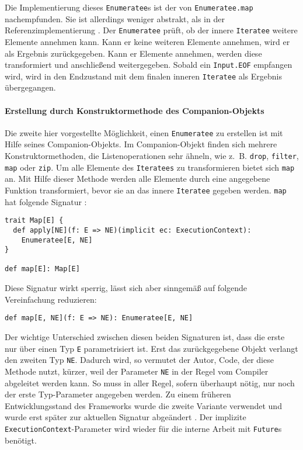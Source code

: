 Die Implementierung dieses \lstinline|Enumeratee|s ist der von \lstinline|Enumeratee.map| nachempfunden.
Sie ist allerdings weniger abstrakt, als in der Referenzimplementierung \cite[vgl.][Z.~372, Z.~196 und Z.~85]{play_enumeratee_source_code}.
Der \lstinline|Enumeratee| prüft, ob der innere \lstinline|Iteratee| weitere Elemente annehmen kann.
Kann er keine weiteren Elemente annehmen, wird er als Ergebnis zurückgegeben.
Kann er Elemente annehmen, werden diese transformiert und anschließend weitergegeben.
Sobald ein \lstinline|Input.EOF| empfangen wird, wird in den Endzustand mit dem finalen inneren \lstinline|Iteratee| als Ergebnis übergegangen.


\paragraph{Erstellung durch Konstruktormethode des Companion-Objekts} %
\label{par:enumerateeerstellung_durch_konstruktormethode_des_companion_objekts}\mbox{} %

Die zweite hier vorgestellte Möglichkeit, einen \lstinline|Enumeratee| zu erstellen ist mit Hilfe seines Companion-Objekts.
Im Companion-Objekt finden sich mehrere Konstruktormethoden, die Listenoperationen sehr ähneln, wie z.~B. \lstinline|drop|, \lstinline|filter|, \lstinline|map| oder \lstinline|zip|.
Um alle Elemente des \lstinline|Iteratees| zu transformieren bietet sich \lstinline|map| an.
Mit Hilfe dieser Methode werden alle Elemente durch eine angegebene Funktion transformiert, bevor sie an das innere \lstinline|Iteratee| gegeben werden.
\lstinline|map| hat folgende Signatur \cite[vgl.][Z.~361]{play_enumeratee_source_code}:
\begin{lstlisting}[caption=Die Signatur von Enumeratee.map, label=lst:die_signatur_von_enumeratee_map]
trait Map[E] {
  def apply[NE](f: E => NE)(implicit ec: ExecutionContext):
    Enumeratee[E, NE]
}

def map[E]: Map[E]
\end{lstlisting}
Diese Signatur wirkt sperrig, lässt sich aber sinngemäß auf folgende Vereinfachung reduzieren:
\begin{lstlisting}[caption=Die vereinfachte Signatur von Enumeratee.map, label=lst:die_vereinfachte_signatur_von_enumeratee_map]
def map[E, NE](f: E => NE): Enumeratee[E, NE]
\end{lstlisting}

Der wichtige Unterschied zwischen diesen beiden Signaturen ist, dass die erste nur über einen Typ \lstinline|E| parametrisiert ist.
Erst das zurückgegebene Objekt verlangt den zweiten Typ \lstinline|NE|.
Dadurch wird, so vermutet der Autor, Code, der diese Methode nutzt, kürzer, weil der Parameter \lstinline|NE| in der Regel vom Compiler abgeleitet werden kann.
So muss in aller Regel, sofern überhaupt nötig, nur noch der erste Typ-Parameter angegeben werden.
Zu einem früheren Entwicklungsstand des Frameworks wurde die zweite Variante verwendet und wurde erst später zur aktuellen Signatur abgeändert \cite[vgl.][]{play_enumeratee_map_signatur}.
Der implizite \lstinline|ExecutionContext|-Parameter wird wieder für die interne Arbeit mit \lstinline|Future|s benötigt.


